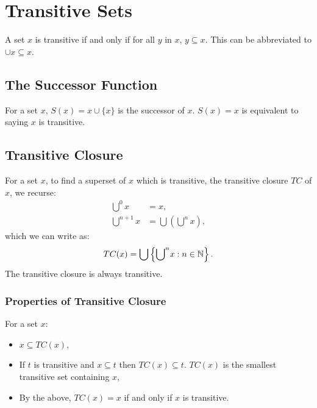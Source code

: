 \section{Transitive Sets}

A set $x$ is transitive if and only if
for all $y$ in $x$, $y \subseteq x$.
This can be abbreviated to $\cup x \subseteq x$.

\subsection{The Successor Function}

For a set $x$, $S(x) = x \cup \{x\}$ is the successor of $x$.
$S(x) = x$ is equivalent to saying $x$ is transitive.

\subsection{Transitive Closure}

For a set $x$, to find a superset of $x$ which is transitive,
the transitive closure $TC$ of $x$, we recurse: \begin{align*}
    {\bigcup}^0 x &= x, \\
    {\bigcup}^{n + 1} x &= \bigcup\left({\bigcup}^n x\right),
\end{align*} which we can write as: \begin{align*}
    TC(x) = \bigcup\left\{{\bigcup}^n x : n \in \mathbb{N}\right\}.
\end{align*} The transitive closure is always transitive.

\subsubsection{Properties of Transitive Closure}

For a set $x$: \begin{itemize}
    \item $x \subseteq TC(x)$,
    \item If $t$ is transitive and $x \subseteq t$ then
        $TC(x) \subseteq t$. $TC(x)$ is the smallest
        transitive set containing $x$,
    \item By the above, $TC(x) = x$ if and only if $x$ is
        transitive.
\end{itemize}

